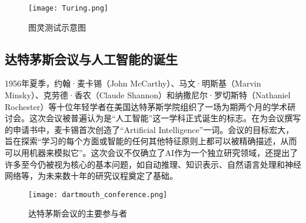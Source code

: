 \begin{figure}[H]
    \centering
    \texttt{[image: Turing.png]} 
    \caption{图灵测试示意图}
    \label{fig:turing_test}
\end{figure}

\subsection{达特茅斯会议与人工智能的诞生}
\label{ssec:dartmouth_conference}
1956年夏季，约翰·麦卡锡（John McCarthy）、马文·明斯基（Marvin Minsky）、克劳德·香农（Claude Shannon）和纳撒尼尔·罗切斯特（Nathaniel Rochester）等十位年轻学者在美国达特茅斯学院组织了一场为期两个月的学术研讨会。这次会议被普遍认为是“人工智能”这一学科正式诞生的标志。在为会议撰写的申请书中，麦卡锡首次创造了“Artificial Intelligence”一词。会议的目标宏大，旨在探索“学习的每个方面或智能的任何其他特征原则上都可以被精确描述，从而可以用机器来模拟它”。这次会议不仅确立了AI作为一个独立研究领域，还提出了许多至今仍被视为核心的基本问题，如自动推理、知识表示、自然语言处理和神经网络等，为未来数十年的研究议程奠定了基础。
\begin{figure}[H]
    \centering
    \texttt{[image: dartmouth\_conference.png]} 
    \caption{达特茅斯会议的主要参与者}
    \label{fig:dartmouth_conference}
\end{figure}
